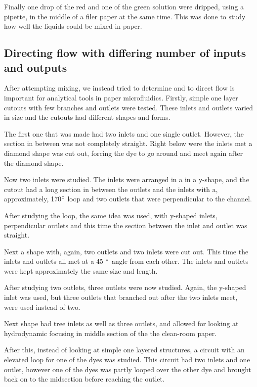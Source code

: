 Finally one drop of the red and one of the green solution were dripped, using a pipette, in the middle of a filer paper at the same time. This was done to study how well the liquids could be mixed in paper.

\subsection{Directing flow with differing number of inputs and outputs}
After attempting mixing, we instead tried to determine and to direct flow is important for analytical tools in paper microfluidics.  Firstly, simple one layer cutouts with few branches and outlets were tested. These inlets and outlets varied in size and the cutouts had different shapes and forms.

The first one that was made had two inlets and one single outlet. However, the section in between was not completely straight. Right below were the inlets met a diamond shape was cut out, forcing the dye to go around and meet again after the diamond shape.

Now two inlets were studied. The inlets were arranged in a in a y-shape, and the cutout had a long section in between the outlets and the inlets with a, approximately, 170$\degree$ loop and two outlets that were perpendicular to the channel.

After studying the loop, the same idea was used, with y-shaped inlets, perpendicular outlets and this time the section between the inlet and outlet was straight. 

Next a shape with, again, two outlets and two inlets were cut out. This time the inlets and outlets all met at a 45 $\degree$ angle from each other. The inlets and outlets were kept approximately the same size and length. 

After studying two outlets, three outlets were now studied. Again, the y-shaped inlet was used, but three outlets that branched out after the two inlets meet, were used instead of two. 

Next shape had tree inlets as well as three outlets, and allowed for looking at hydrodynamic focusing in middle section of the the clean-room paper.

After this, instead of looking at simple one layered structures, a circuit with an elevated loop for one of the dyes was studied. This circuit had two inlets and one outlet, however one of the dyes was partly looped over the other dye and brought back on to the midsection before reaching the outlet.

